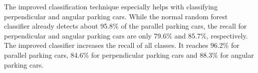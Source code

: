 The improved classification technique especially helps with classifying perpendicular and angular parking cars. While the normal random forest classifier already detects about 95.8\% of the parallel parking cars, the recall for perpendicular and angular parking cars are only 79.6\% and 85.7\%, respectively. The improved classifier increases the recall of all classes. It reaches 96.2\% for parallel parking cars, 84.6\% for perpendicular parking cars and 88.3\% for angular parking cars. 




 










\begin{table}


\caption{Confusion Matrix of the best found configuration of the proposed two staged classification technique (two random forests and using 10 surrounding samples).}
\label{table:surrounding_classifier_confusion_matrix}
\end{table}

